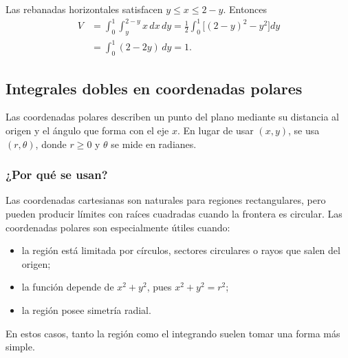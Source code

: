 \begin{center}
\end{center}

Las rebanadas horizontales satisfacen $y\leq x\leq2-y$. Entonces
\begin{align*}
V&=\int_0^1\int_y^{2-y}x\,dx\,dy
=\frac12\int_0^1\bigl[(2-y)^2-y^2\bigr]dy\\
 &=\int_0^1(2-2y)\,dy=1.
\end{align*}

\subsection{Integrales dobles en coordenadas polares}

Las coordenadas polares describen un punto del plano mediante su distancia al origen y el ángulo que forma con el eje $x$. En lugar de usar $(x,y)$, se usa $(r,\theta)$, donde $r\geq0$ y $\theta$ se mide en radianes.

\subsubsection*{¿Por qué se usan?}

Las coordenadas cartesianas son naturales para regiones rectangulares, pero pueden producir límites con raíces cuadradas cuando la frontera es circular. Las coordenadas polares son especialmente útiles cuando:
\begin{itemize}
    \item la región está limitada por círculos, sectores circulares o rayos que salen del origen;
    \item la función depende de $x^2+y^2$, pues $x^2+y^2=r^2$;
    \item la región posee simetría radial.
\end{itemize}
En estos casos, tanto la región como el integrando suelen tomar una forma más simple.

